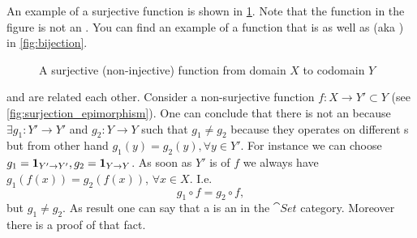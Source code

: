 \begin{example}[Surjection]
An example of a surjective function is shown in \cref{fig:surjection}.
Note that the function in the figure is not an
. You can find an example of a function that
is  as well as  (aka
) in \cref{fig:bijection}.
\begin{figure}[H]
  \centering
  \caption{A surjective (non-injective) function from domain $X$ to
    codomain $Y$ }
  \label{fig:surjection}
\end{figure}
\end{example}

\begin{remark}
  \label{rem:surjection_epimorphism}
   and  are
  related each other. Consider a non-surjective function $f: X
  \rightarrow Y' \subset Y$ (see \cref{fig:surjection_epimorphism}). One can
  conclude that there is not an  because  
  $\exists g_1: Y' \to Y'$ and  $g_2 : Y \to Y$ such
  that $g_1 \ne g_2$ because they operates on different
  s but from other hand $g_1(y) = g_2(y),
  \forall y \in Y'$. For
  instance we can choose $g_1 = \mathbf{1}_{ Y' \to Y' }, g_2=\mathbf{1}_{ Y \to Y }$. As
  soon as $Y'$ is  of $f$ we always have
  $g_1(f(x)) = g_2(f(x))$, $\forall x \in X$. I.e. 
  \[
  g_1 \circ f = g_2 \circ f,
  \]
  but $g_1 \ne g_2$. As result one can say that a
   is an 
   in the $\cat{Set}$ category. Moreover
  there is a proof 
  \cite{bib:proofwiki:Surjection_iff_Epimorphism_in_Category_of_Sets}
  of that fact.

\end{remark}



